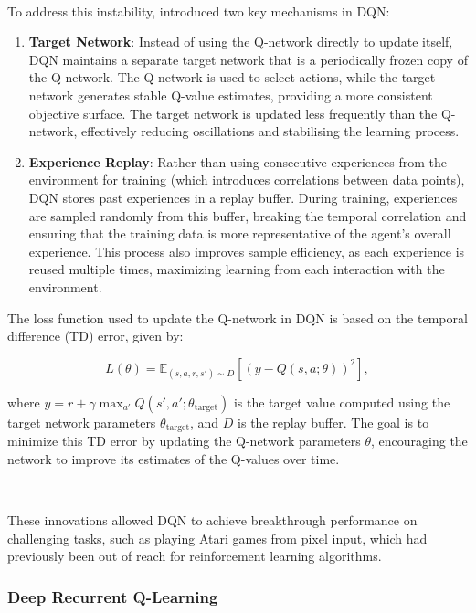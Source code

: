 \documentclass{article}
\begin{document}
\

To address this instability, \citet{mnih2013playing} introduced two key mechanisms in DQN:

\begin{enumerate}
	\item \textbf{Target Network}: Instead of using the Q-network directly to update itself, DQN maintains a separate target network that is a periodically frozen copy of the Q-network. The Q-network is used to select actions, while the target network generates stable Q-value estimates, providing a more consistent objective surface. The target network is updated less frequently than the Q-network, effectively reducing oscillations and stabilising the learning process.
	\item \textbf{Experience Replay}: Rather than using consecutive experiences from the environment for training (which introduces correlations between data points), DQN stores past experiences in a replay buffer. During training, experiences are sampled randomly from this buffer, breaking the temporal correlation and ensuring that the training data is more representative of the agent's overall experience. This process also improves sample efficiency, as each experience is reused multiple times, maximizing learning from each interaction with the environment.

\end{enumerate}

The loss function used to update the Q-network in DQN is based on the temporal difference (TD) error, given by:

\begin{equation}
L(\theta) = \mathbb{E}_{(s, a, r, s') \sim D} \left[ \left( y - Q(s, a; \theta) \right)^2 \right],
\end{equation}

where $y = r + \gamma \max_{a'} Q(s', a'; \theta_\text{target})$ is the target value computed using the target network parameters $\theta_\text{target}$, and $D$ is the replay buffer. The goal is to minimize this TD error by updating the Q-network parameters $\theta$, encouraging the network to improve its estimates of the Q-values over time.

\

These innovations allowed DQN to achieve breakthrough performance on challenging tasks, such as playing Atari games from pixel input, which had previously been out of reach for reinforcement learning algorithms.

\subsubsection{Deep Recurrent Q-Learning}\label{sec:drqn}
\end{document}
